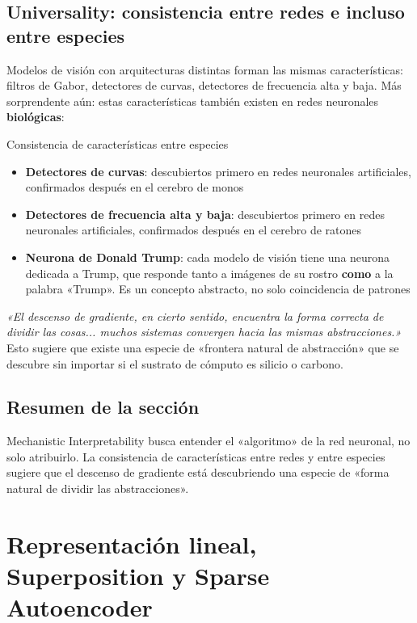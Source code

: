 \documentclass[a4paper]{article}
\begin{document}
\subsection{Universality: consistencia entre redes e incluso entre especies}

Modelos de visión con arquitecturas distintas forman las mismas características: filtros de Gabor, detectores de curvas, detectores de frecuencia alta y baja. Más sorprendente aún: estas características también existen en redes neuronales \textbf{biológicas}:

\begin{knowledgebox}{Consistencia de características entre especies}
\begin{itemize}
    \item \textbf{Detectores de curvas}: descubiertos primero en redes neuronales artificiales, confirmados después en el cerebro de monos
    \item \textbf{Detectores de frecuencia alta y baja}: descubiertos primero en redes neuronales artificiales, confirmados después en el cerebro de ratones
    \item \textbf{Neurona de Donald Trump}: cada modelo de visión tiene una neurona dedicada a Trump, que responde tanto a imágenes de su rostro \textbf{como} a la palabra «Trump». Es un concepto abstracto, no solo coincidencia de patrones
\end{itemize}

\textit{«El descenso de gradiente, en cierto sentido, encuentra la forma correcta de dividir las cosas... muchos sistemas convergen hacia las mismas abstracciones.»} Esto sugiere que existe una especie de «frontera natural de abstracción» que se descubre sin importar si el sustrato de cómputo es silicio o carbono.
\end{knowledgebox}

\subsection{Resumen de la sección}

Mechanistic Interpretability busca entender el «algoritmo» de la red neuronal, no solo atribuirlo. La consistencia de características entre redes y entre especies sugiere que el descenso de gradiente está descubriendo una especie de «forma natural de dividir las abstracciones».
\section{Representación lineal, Superposition y Sparse Autoencoder}
\end{document}
